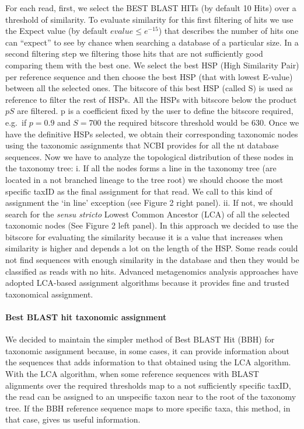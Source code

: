 \documentclass[fleqn,10pt,lineno]{wlpeerj}
\begin{document}
For each read, first, we select the BEST BLAST HITs (by default 10 Hits)
over a threshold of similarity. To evaluate similarity for this first
filtering of hits we use the Expect value (by default
\(evalue \leq e^{-15}\)) that describes the number of hits one can
``expect'' to see by chance when searching a database of a particular
size. In a second filtering step we filtering those hits that are not
sufficiently good comparing them with the best one. We select the best
HSP (High Similarity Pair) per reference sequence and then choose the
best HSP (that with lowest E-value) between all the selected ones. The
bitscore of this best HSP (called S) is used as reference to filter the
rest of HSPs. All the HSPs with bitscore below the product \(p S\) are
filtered. p is a coefficient fixed by the user to define the bitscore
required, e.g.~if \(p=0.9\) and \(S=700\) the required bitscore
threshold would be \(630\). Once we have the definitive HSPs selected,
we obtain their corresponding taxonomic nodes using the taxonomic
assignments that NCBI provides for all the nt database sequences. Now we
have to analyze the topological distribution of these nodes in the
taxonomy tree: i. If all the nodes forms a line in the taxonomy tree
(are located in a not branched lineage to the tree root) we should
choose the most specific taxID as the final assignment for that read. We
call to this kind of assignment the `in line' exception (see Figure 2
right panel). ii. If not, we should search for the \emph{sensu stricto}
Lowest Common Ancestor (LCA) of all the selected taxonomic nodes (See
Figure 2 left panel). In this approach we decided to use the bitscore
for evaluating the similarity because it is a value that increases when
similarity is higher and depends a lot on the length of the HSP. Some
reads could not find sequences with enough similarity in the database
and then they would be classified as reads with no hits. Advanced
metagenomics analysis approaches \citep{huson2012microbial} have adopted
LCA-based assignment algorithms because it provides fine and trusted
taxonomical assignment.

\paragraph{Best BLAST hit taxonomic
assignment}\label{best-blast-hit-taxonomic-assignment}

We decided to maintain the simpler method of Best BLAST Hit (BBH) for
taxonomic assignment because, in some cases, it can provide information
about the sequences that adds information to that obtained using the LCA
algorithm. With the LCA algorithm, when some reference sequences with
BLAST alignments over the required thresholds map to a not sufficiently
specific taxID, the read can be assigned to an unspecific taxon near to
the root of the taxonomy tree. If the BBH reference sequence maps to
more specific taxa, this method, in that case, gives us useful
information.
\end{document}
